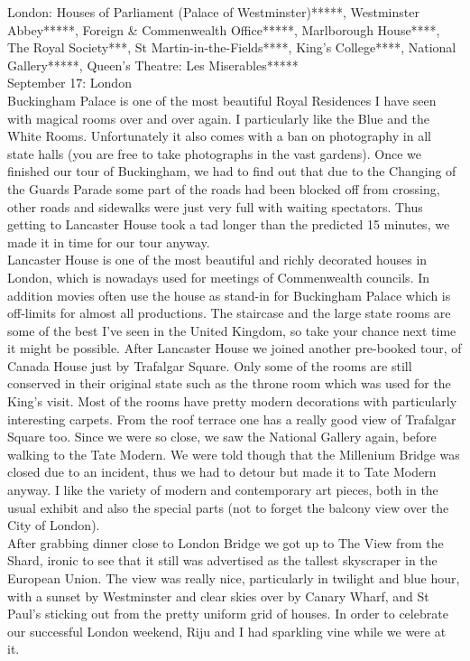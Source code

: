 London: Houses of Parliament (Palace of Westminster)*****, Westminster Abbey*****, Foreign \& Commenwealth Office*****, Marlborough House****, The Royal Society***, St Martin-in-the-Fields****, King's College****, National Gallery*****, Queen's Theatre: Les Miserables*****\\

September 17: London\\
Buckingham Palace is one of the most beautiful Royal Residences I have seen with magical rooms over and over again. I particularly like the Blue and the White Rooms. Unfortunately it also comes with a ban on photography in all state halls (you are free to take photographs in the vast gardens).  Once we finished our tour of Buckingham, we had to find out that due to the Changing of the Guards Parade some part of the roads had been blocked off from crossing, other roads and sidewalks were just very full with waiting spectators. Thus getting to Lancaster House took a tad longer than the predicted 15 minutes, we made it in time for our tour anyway. \\
Lancaster House is one of the most beautiful and richly decorated houses in London, which is nowadays used for meetings of Commenwealth councils. In addition movies often use the house as stand-in for Buckingham Palace which is off-limits for almost all productions. The staircase and the large state rooms are some of the best I've seen in the United Kingdom, so take your chance next time it might be possible. After Lancaster House we joined another pre-booked tour, of Canada House just by Trafalgar Square. Only some of the rooms are still conserved in their original state such as the throne room which was used for the King's visit. Most of the rooms have pretty modern decorations with particularly interesting carpets. From the roof terrace one has a really good view of Trafalgar Square too. Since we were so close, we saw the National Gallery again, before walking to the Tate Modern. We were told though that the Millenium Bridge was closed due to an incident, thus we had to detour but made it to Tate Modern anyway. I like the variety of modern and contemporary art pieces, both in the usual exhibit and also the special parts (not to forget the balcony view over the City of London). \\
After grabbing dinner close to London Bridge we got up to The View from the Shard, ironic to see that it still was advertised as the tallest skyscraper in the European Union. The view was really nice, particularly in twilight and blue hour, with a sunset by Westminster and clear skies over by Canary Wharf, and St Paul's sticking out from the pretty uniform grid of houses. In order to celebrate our successful London weekend, Riju and I had sparkling vine while we were at it.\\

